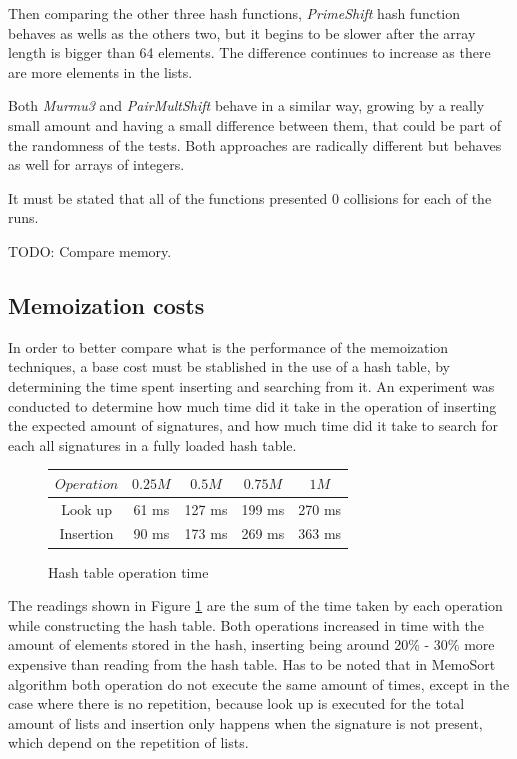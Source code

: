 \documentclass[a4paper,12pt]{article}
\begin{document}
Then comparing the other three hash functions, {\it PrimeShift} hash function behaves as wells as the others two, but it begins to be slower after the array length is bigger than 64 elements. The difference continues to increase as there are more elements in the lists.

Both {\it Murmu3} and {\it PairMultShift} behave in a similar way, growing by a really small amount and having a small difference between them, that could be part of the randomness of the tests. Both approaches are radically different but behaves as well for arrays of integers.

It must be stated that all of the functions presented 0 collisions for each of the runs.

TODO: Compare memory.

\subsection{Memoization costs}

In order to better compare what is the performance of the memoization techniques, a base cost must be stablished in the use of a hash table, by determining the time spent inserting and searching from it. An experiment was conducted to determine how much time did it take in the operation of inserting the expected amount of signatures, and how much time did it take to search for each all signatures in a fully loaded hash table. \\

\begin{figure}[H]
\centering
\begin{tabular}{|c|c|c|c|c|}  \toprule
	{$Operation$} & {$0.25M$} & {$0.5M$} & {$0.75M$} & {$1M$} \\ \midrule
	Look up & 61 ms & 127 ms& 199 ms & 270 ms\\ 
	Insertion & 90 ms & 173 ms& 269 ms& 363 ms\\ \bottomrule
\end{tabular}
\caption{Hash table operation time}
\label{ref:MemCostTable}
\end{figure}

The readings shown in Figure \ref{ref:MemCostTable} are the sum of the time taken by each operation while constructing the hash table. Both operations increased in time with the amount of elements stored in the hash, inserting being around 20\% - 30\% more expensive than reading from the hash table. Has to be noted that in MemoSort algorithm both operation do not execute the same amount of times, except in the case where there is no repetition, because look up is executed for the total amount of lists and insertion only happens when the signature is not present, which depend on the repetition of lists.
\end{document}

